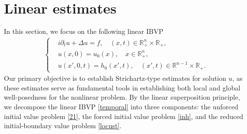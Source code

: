 \documentclass[preprint,compress,12pt]{elsarticle}
\numberwithin{equation}{section}
\begin{document}
\section{Linear estimates}\label{sec2}
In this section, we focus on the following linear IBVP
\begin{align}\label{temporal}
	\left\{\begin{aligned}
		&	i\partial_{t}u+\Delta u=f, \quad (x, t) \in \mathbb{R}_{+}^{n} \times \mathbb{R}_{+}, \\
		&u(x,0)=u_0(x), \quad x\in\mathbb{R}^{n}_{+},\\& u(x',0,t)=h_{0}(x',t), \quad  (x',t)\in \mathbb{R}^{n-1}\times \mathbb{R}_{+}.
	\end{aligned}
	\right.		
\end{align}
Our primary objective is to establish Strichartz-type estimates for solution $u$, as these estimates serve as fundamental tools in establishing both local and global well-posedness for the nonlinear problem. By the linear superposition principle, we decompose the linear IBVP \eqref{temporal} into three components: the unforced initial value problem \eqref{21}, the forced initial value problem \eqref{inh}, and the reduced initial-boundary value problem \eqref{locust}.
\end{document}

